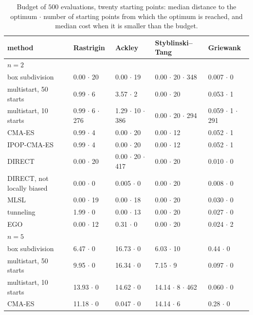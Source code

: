 \begin{table}[t]
  \centering
  \caption{Budget of $500$ evaluations, twenty starting points: median
    distance to the optimum $\cdot$ number of starting points from which
    the optimum is reached, and median cost when it is smaller than the
    budget.}
  \label{tab:small}
  \scriptsize
  \setlength{\tabcolsep}{3pt}
  \begin{tabular}{lllll}
    \toprule
    method & Rastrigin & Ackley & Styblinski--Tang & Griewank \\
    \midrule
    \multicolumn{5}{l}{$n = 2$} \\
    box subdivision & 0.00 $\cdot$ 20 & 0.00 $\cdot$ 19 & 0.00 $\cdot$ 20 $\cdot$ 348 & 0.007 $\cdot$ 0 \\
    multistart, 50 starts & 0.99 $\cdot$ 6 & 3.57 $\cdot$ 2 & 0.00 $\cdot$ 20 & 0.053 $\cdot$ 1 \\
    multistart, 10 starts & 0.99 $\cdot$ 6 $\cdot$ 276 & 1.29 $\cdot$ 10 $\cdot$ 386 & 0.00 $\cdot$ 20 $\cdot$ 294 & 0.059 $\cdot$ 1 $\cdot$ 291 \\
    CMA-ES & 0.99 $\cdot$ 4 & 0.00 $\cdot$ 20 & 0.00 $\cdot$ 12 & 0.052 $\cdot$ 1 \\
    IPOP-CMA-ES & 0.99 $\cdot$ 4 & 0.00 $\cdot$ 20 & 0.00 $\cdot$ 12 & 0.052 $\cdot$ 1 \\
    DIRECT & 0.00 $\cdot$ 20 & 0.00 $\cdot$ 20 $\cdot$ 417 & 0.00 $\cdot$ 20 & 0.010 $\cdot$ 0 \\
    DIRECT, not locally biased & 0.00 $\cdot$ 0 & 0.005 $\cdot$ 0 & 0.00 $\cdot$ 20 & 0.008 $\cdot$ 0 \\
    MLSL & 0.00 $\cdot$ 19 & 0.00 $\cdot$ 18 & 0.00 $\cdot$ 20 & 0.030 $\cdot$ 0 \\
    tunneling & 1.99 $\cdot$ 0 & 0.00 $\cdot$ 13 & 0.00 $\cdot$ 20 & 0.027 $\cdot$ 0 \\
    EGO & 0.00 $\cdot$ 12 & 0.31 $\cdot$ 0 & 0.00 $\cdot$ 20 & 0.024 $\cdot$ 2 \\
    \midrule
    \multicolumn{5}{l}{$n = 5$} \\
    box subdivision & 6.47 $\cdot$ 0 & 16.73 $\cdot$ 0 & 6.03 $\cdot$ 10 & 0.44 $\cdot$ 0 \\
    multistart, 50 starts & 9.95 $\cdot$ 0 & 16.34 $\cdot$ 0 & 7.15 $\cdot$ 9 & 0.097 $\cdot$ 0 \\
    multistart, 10 starts & 13.93 $\cdot$ 0 & 14.62 $\cdot$ 0 & 14.14 $\cdot$ 8 $\cdot$ 462 & 0.060 $\cdot$ 0 \\
    CMA-ES & 11.18 $\cdot$ 0 & 0.047 $\cdot$ 0 & 14.14 $\cdot$ 6 & 0.28 $\cdot$ 0 \\

\end{tabular}
\end{table}
